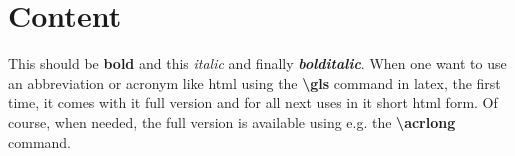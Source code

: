 \documentclass[11pt,a4paper,oneside,article]{memoir}
\begin{document}
\pagestyle{empty} %
\tableofcontents*
\pagestyle{empty} %


\clearpage






\newpage

\pagestyle{plain}

\setcounter{page}{1} %
\ClearWallPaper

\sloppy %

\chapter{Content}
This should be \textbf{bold} and this \textit{italic} and finally \textbf{\textit{bolditalic}}. When one want to use an abbreviation or acronym like \gls{html} using the \textbf{\textbackslash{}gls} command in \gls{latex}, the first time, it comes with it full version and for all next uses in it short \gls{html} form. Of course, when needed, the full version is available using e.g. the \textbf{\textbackslash{}acrlong} command.
\end{document}
